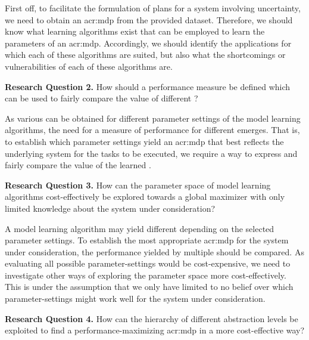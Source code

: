First off, to facilitate the formulation of plans for a system involving uncertainty, we need to obtain an \acrshort{acr:mdp} from the provided dataset.
Therefore, we should know what learning algorithms exist that can be employed to learn the parameters of an \acrshort{acr:mdp}.
Accordingly, we should identify the applications for which each of these algorithms are suited, but also what the shortcomings or vulnerabilities of each of these algorithms are.

\vspace{16pt}
\noindent%
\textbf{Research Question 2.} How should a performance measure be defined which can be used to fairly compare the value of different ?
\vspace{12pt}

As various  can be obtained for different parameter settings of the model learning algorithms, the need for a measure of performance for different  emerges.
That is, to establish which parameter settings yield an \acrshort{acr:mdp} that best reflects the underlying system for the tasks to be executed, we require a way to express and fairly compare the value of the learned .

\vspace{16pt}
\noindent%
\textbf{Research Question 3.} How can the parameter space of model learning algorithms cost-effectively be explored towards a global maximizer with only limited knowledge about the system under consideration?
\vspace{12pt}

A model learning algorithm may yield different  depending on the selected parameter settings.
To establish the most appropriate \acrshort{acr:mdp} for the system under consideration, the performance yielded by multiple  should be compared.
As evaluating all possible parameter-settings would be cost-expensive, we need to investigate other ways of exploring the parameter space more cost-effectively.
This is under the assumption that we only have limited to no belief over which parameter-settings might work well for the system under consideration.

\vspace{16pt}
\noindent%
\textbf{Research Question 4.} How can the hierarchy of different abstraction levels be exploited to find a performance-maximizing \acrshort{acr:mdp} in a more cost-effective way?
\vspace{12pt}

